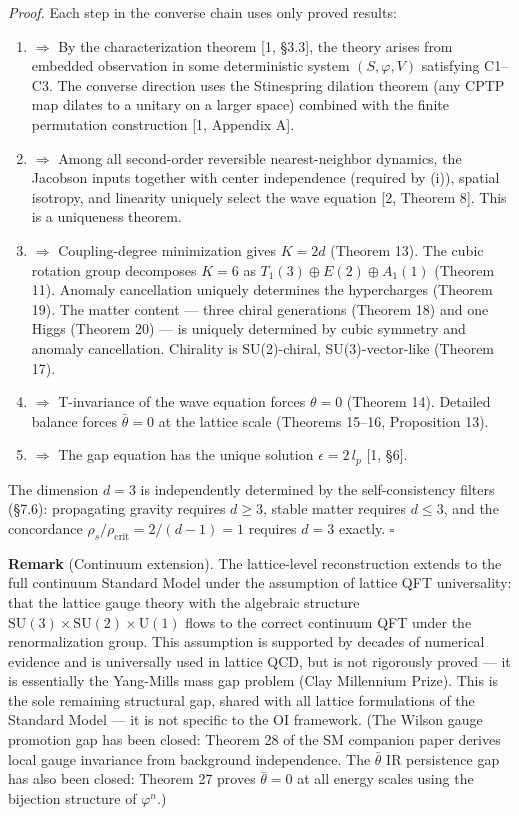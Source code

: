 \documentclass[
  11pt,
]{article}
\begin{document}
\emph{Proof.} Each step in the converse chain uses only proved results:

\begin{enumerate}
\def\labelenumi{(\roman{enumi})}
\item
  \(\Rightarrow\) By the characterization theorem {[}1, §3.3{]}, the
  theory arises from embedded observation in some deterministic system
  \((S, \varphi, V)\) satisfying C1--C3. The converse direction uses the
  Stinespring dilation theorem (any CPTP map dilates to a unitary on a
  larger space) combined with the finite permutation construction {[}1,
  Appendix A{]}.
\item
  \(\Rightarrow\) Among all second-order reversible nearest-neighbor
  dynamics, the Jacobson inputs together with center independence
  (required by (i)), spatial isotropy, and linearity uniquely select the
  wave equation {[}2, Theorem 8{]}. This is a uniqueness theorem.
\item
  \(\Rightarrow\) Coupling-degree minimization gives \(K = 2d\) (Theorem
  13). The cubic rotation group decomposes \(K = 6\) as
  \(T_1(3) \oplus E(2) \oplus A_1(1)\) (Theorem 11). Anomaly
  cancellation uniquely determines the hypercharges (Theorem 19). The
  matter content --- three chiral generations (Theorem 18) and one Higgs
  (Theorem 20) --- is uniquely determined by cubic symmetry and anomaly
  cancellation. Chirality is SU(2)-chiral, SU(3)-vector-like (Theorem
  17).
\item
  \(\Rightarrow\) T-invariance of the wave equation forces
  \(\theta = 0\) (Theorem 14). Detailed balance forces
  \(\bar{\theta} = 0\) at the lattice scale (Theorems 15--16,
  Proposition 13).
\item
  \(\Rightarrow\) The gap equation has the unique solution
  \(\epsilon = 2\,l_p\) {[}1, §6{]}.
\end{enumerate}

The dimension \(d = 3\) is independently determined by the
self-consistency filters (§7.6): propagating gravity requires
\(d \geq 3\), stable matter requires \(d \leq 3\), and the concordance
\(\rho_s / \rho_{\mathrm{crit}} = 2/(d-1) = 1\) requires \(d = 3\)
exactly. \(\square\)

\textbf{Remark} (Continuum extension). The lattice-level reconstruction
extends to the full continuum Standard Model under the assumption of
lattice QFT universality: that the lattice gauge theory with the
algebraic structure
\(\mathrm{SU}(3) \times \mathrm{SU}(2) \times \mathrm{U}(1)\) flows to
the correct continuum QFT under the renormalization group. This
assumption is supported by decades of numerical evidence and is
universally used in lattice QCD, but is not rigorously proved --- it is
essentially the Yang-Mills mass gap problem (Clay Millennium Prize).
This is the sole remaining structural gap, shared with all lattice
formulations of the Standard Model --- it is not specific to the OI
framework. (The Wilson gauge promotion gap has been closed: Theorem 28
of the SM companion paper derives local gauge invariance from background
independence. The \(\bar{\theta}\) IR persistence gap has also been
closed: Theorem 27 proves \(\bar{\theta} = 0\) at all energy scales
using the bijection structure of \(\varphi^n\).)
\end{document}
